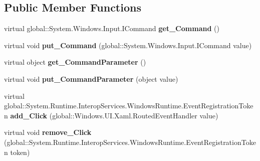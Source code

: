 \subsection*{Public Member Functions}
\begin{DoxyCompactItemize}
\item 
\mbox{\label{class_windows_1_1_u_i_1_1_xaml_1_1_controls_1_1_primitives_1_1_button_base_a828bb580c4aeeb639426f27ce0b6c586}} 
virtual global\+::\+System.\+Windows.\+Input.\+I\+Command {\bfseries get\+\_\+\+Command} ()
\item 
\mbox{\label{class_windows_1_1_u_i_1_1_xaml_1_1_controls_1_1_primitives_1_1_button_base_a27ec61fd5abbda5b2d691374503645fc}} 
virtual void {\bfseries put\+\_\+\+Command} (global\+::\+System.\+Windows.\+Input.\+I\+Command value)
\item 
\mbox{\label{class_windows_1_1_u_i_1_1_xaml_1_1_controls_1_1_primitives_1_1_button_base_a71053af3b8056232052cbff4a66ff6f1}} 
virtual object {\bfseries get\+\_\+\+Command\+Parameter} ()
\item 
\mbox{\label{class_windows_1_1_u_i_1_1_xaml_1_1_controls_1_1_primitives_1_1_button_base_a86576fdbbfa333daaeb36e8f5a364daa}} 
virtual void {\bfseries put\+\_\+\+Command\+Parameter} (object value)
\item 
\mbox{\label{class_windows_1_1_u_i_1_1_xaml_1_1_controls_1_1_primitives_1_1_button_base_a31798116cfe3b23bc8cca409f8286eb8}} 
virtual global\+::\+System.\+Runtime.\+Interop\+Services.\+Windows\+Runtime.\+Event\+Registration\+Token {\bfseries add\+\_\+\+Click} (global\+::\+Windows.\+U\+I.\+Xaml.\+Routed\+Event\+Handler value)
\item 
\mbox{\label{class_windows_1_1_u_i_1_1_xaml_1_1_controls_1_1_primitives_1_1_button_base_ab98c10641e50dd837e7182b45444a6cb}} 
virtual void {\bfseries remove\+\_\+\+Click} (global\+::\+System.\+Runtime.\+Interop\+Services.\+Windows\+Runtime.\+Event\+Registration\+Token token)

\end{DoxyCompactItemize}
